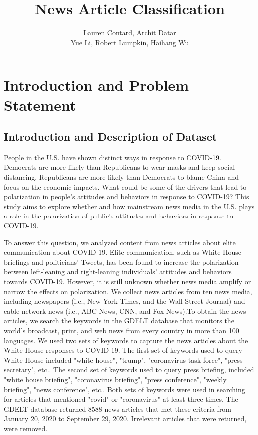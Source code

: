 \documentclass[11pt]{article}
\title{\Huge News Article Classification}
\author{Lauren Contard, Archit Datar \\ 
Yue Li, Robert Lumpkin, Haihang Wu}
\date{}
\begin{document}
\begin{singlespace}
    \maketitle
\end{singlespace}

\vspace{-4em}
\section{Introduction and Problem Statement}
\subsection{Introduction and Description of Dataset}

People in the U.S. have shown distinct ways in response to COVID-19. Democrats are more likely than Republicans to wear masks and keep social distancing. Republicans are more likely than Democrats to blame China and focus on the economic impacts. What could be some of the drivers that lead to polarization in people's attitudes and behaviors in response to COVID-19? This study aims to explore whether and how mainstream news media in the U.S. plays a role in the polarization of public's attitudes and behaviors in response to COVID-19. 

To answer this question, we analyzed content from news articles about elite communication about COVID-19. Elite communication, such as White House briefings and politicians' Tweets, has been found to increase the polarization between left-leaning and right-leaning individuals' attitudes and behaviors towards COVID-19. However, it is still unknown whether news media amplify or narrow the effects on polarization. We collect news articles from ten news media, including newspapers (i.e., New York Times, and the Wall Street Journal) and cable network news (i.e., ABC News, CNN, and Fox News).To obtain the news articles, we search the keywords in the GDELT database that monitors the world's broadcast, print, and web news from every country in more than 100 languages. We used two sets of keywords to capture the news articles about the White House responses to COVID-19. The first set of keywords used to query White House included "white house", "trump", "coronavirus task force", "press secretary", etc.. The second set of keywords used to query press briefing, included "white house briefing", "coronavirus briefing", "press conference", "weekly briefing", "news conference", etc.. Both sets of keywords were used in searching for articles that mentioned "covid" or "coronavirus" at least three times. The GDELT database returned 8588 news articles that met these criteria from January 20, 2020 to September 29, 2020. Irrelevant articles that were returned, were removed.
\end{document}
